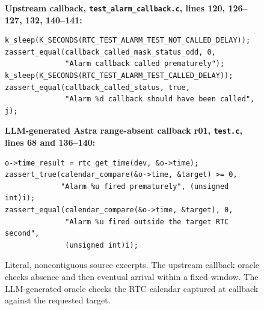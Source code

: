 \begin{figure}[t]
\footnotesize
\textbf{Upstream callback, \texttt{test\_alarm\_callback.c}, lines 120, 126--127, 132, 140--141:}
\begin{verbatim}
k_sleep(K_SECONDS(RTC_TEST_ALARM_TEST_NOT_CALLED_DELAY));
zassert_equal(callback_called_mask_status_odd, 0,
              "Alarm callback called prematurely");
k_sleep(K_SECONDS(RTC_TEST_ALARM_TEST_CALLED_DELAY));
zassert_equal(callback_called_status, true,
              "Alarm %d callback should have been called", j);
\end{verbatim}
\textbf{LLM-generated Astra range-absent callback r01, \texttt{test.c}, lines 68 and 136--140:}
\begin{verbatim}
o->time_result = rtc_get_time(dev, &o->time);
zassert_true(calendar_compare(&o->time, &target) >= 0,
             "Alarm %u fired prematurely", (unsigned int)i);
zassert_equal(calendar_compare(&o->time, &target), 0,
              "Alarm %u fired outside the target RTC second",
              (unsigned int)i);
\end{verbatim}
\caption{Literal, noncontiguous source excerpts. The upstream callback oracle checks absence and then eventual arrival within a fixed window. The LLM-generated oracle checks the RTC calendar captured at callback against the requested target.}
\label{fig:sourcecontrast}
\end{figure}
